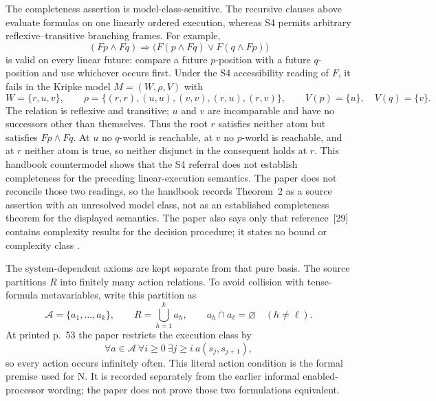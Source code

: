 The completeness assertion is model-class-sensitive.  The recursive clauses
above evaluate formulas on one linearly ordered execution, whereas S4 permits
arbitrary reflexive--transitive branching frames.  For example,
\[
 (Fp\land Fq)\Rightarrow
 \bigl(F(p\land Fq)\lor F(q\land Fp)\bigr)
\]
is valid on every linear future: compare a future \(p\)-position with a future
\(q\)-position and use whichever occurs first.  Under the S4 accessibility
reading of \(F\), it fails in the Kripke model
\(M=(W,\rho,V)\) with
\[
 W=\{r,u,v\},\qquad
 \rho=\{(r,r),(u,u),(v,v),(r,u),(r,v)\},\qquad
 V(p)=\{u\},\quad V(q)=\{v\}.
\]
The relation is reflexive and transitive; \(u\) and \(v\) are incomparable and
have no successors other than themselves.  Thus the root \(r\) satisfies
neither atom but satisfies \(Fp\land Fq\).  At \(u\) no \(q\)-world is
reachable, at \(v\) no \(p\)-world is reachable, and at \(r\) neither atom is
true, so neither disjunct in the consequent holds at \(r\).  This handbook
countermodel shows that the S4 referral does not establish completeness for the
preceding linear-execution semantics.  The paper does not reconcile those two
readings, so the handbook records Theorem~2 as a source assertion with an
unresolved model class, not as an established completeness theorem for the
displayed semantics.  The paper also says only that reference~[29] contains
complexity results for the decision procedure; it states no bound or complexity
class
\cite[pp.~52--53]{Pnueli1977}.

The system-dependent axioms are kept separate from that pure basis.  The
source partitions \(R\) into finitely many action relations.  To avoid
collision with tense-formula metavariables, write this partition as
\[
 \mathcal A=\{a_1,\ldots,a_k\},
 \qquad R=\bigcup_{h=1}^{k}a_h,
 \qquad a_h\cap a_\ell=\varnothing\quad(h\ne\ell).
\]
At printed p.~53 the paper restricts the execution class by
\[
 \forall a\in\mathcal A\ \forall i\ge0\
 \exists j\ge i\ a(s_j,s_{j+1}),
\]
so every action occurs infinitely often.  This literal action condition is
the formal premise used for N.  It is recorded separately from the earlier
informal enabled-processor wording; the paper does not prove those two
formulations equivalent.

